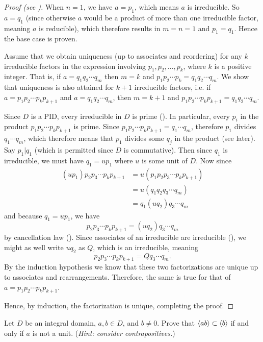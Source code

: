 \begin{proof}[Proof (see {\cite[Theorem 18.3]{gallian_2016}})]
    When $n = 1$, we have $a = p_1$, which means $a$ is irreducible. So $a = q_1$ (since otherwise $a$ would be a product of more than one irreducible factor, meaning $a$ is reducible), which therefore results in $m = n = 1$ and $p_1 = q_1$. Hence the base case is proven.

    Assume that we obtain uniqueness (up to associates and reordering) for any $k$ irreducible factors in the expression involving $p_1, p_2, \dots, p_k$, where $k$ is a positive integer. That is, if $a = q_1q_2 \cdots q_m$ then $m = k$ and $p_1p_2\cdots p_k = q_1q_2 \cdots q_m$. We show that uniqueness is also attained for $k + 1$ irreducible factors, i.e. if $a = p_1p_2\cdots p_kp_{k+1}$ and $a = q_1q_2 \cdots q_m$, then $m = k+1$ and $p_1p_2\cdots p_kp_{k+1} = q_1q_2 \cdots q_m$.

    Since $D$ is a PID, every irreducible in $D$ is prime (). In particular, every $p_i$ in the product $p_1p_2\cdots p_kp_{k+1}$ is prime. Since $p_1p_2\cdots p_kp_{k+1} = q_1\cdots q_m$, therefore $p_1$ divides $q_1\cdots q_m$, which therefore means that $p_1$ divides some $q_j$ in the product (see  later). Say $p_1 \vert q_1$ (which is permitted since $D$ is commutative). Then since $q_1$ is irreducible, we must have $q_1 = up_1$ where $u$ is some unit of $D$. Now since
    \begin{align*}
        (up_1)p_2p_3\cdots p_kp_{k+1} &= u\left(p_1p_2p_3\cdots p_kp_{k+1}\right)\\
        &= u\left(q_1q_2q_3\cdots q_m\right)\\
        &= q_1(uq_2)q_3\cdots q_m
    \end{align*}
    and because $q_1 = up_1$, we have
    \[
        p_2p_3\cdots p_kp_{k+1} = (uq_2)q_3\cdots q_m
    \]
    by cancellation law (). Since associates of an irreducible are irreducible (), we might as well write $uq_2$ as $Q$, which is an irreducible, meaning
    \[
        p_2p_3\cdots p_kp_{k+1} = Qq_3\cdots q_m.
    \]
    By the induction hypothesis we know that these two factorizations are unique up to associates and rearrangements. Therefore, the same is true for that of $a = p_1p_2\cdots p_kp_{k+1}$.

    Hence, by induction, the factorization is unique, completing the proof.
\end{proof}

\begin{exercise}\label{exercise-princ-ab-subset-of-b-iff-a-not-unit}
    Let $D$ be an integral domain, $a,b\in D$, and $b \neq 0$. Prove that $\left\langle ab\right\rangle \subset \left\langle b\right\rangle$ if and only if $a$ is not a unit.\newline
    (\textit{Hint: consider contrapositives.})
\end{exercise}

